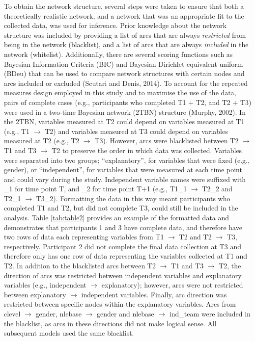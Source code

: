 \documentclass[
  english,
  man,floatsintext]{apa6}
\begin{document}
To obtain the network structure, several steps were taken to ensure that both a theoretically realistic network, and a network that was an appropriate fit to the collected data, was used for inference.
Prior knowledge about the network structure was included by providing a list of arcs that are always \emph{restricted} from being in the network (blacklist), and a list of arcs that are always \emph{included} in the network (whitelist).
Additionally, there are several scoring functions such as Bayesian Information Criteria (BIC) and Bayesian Dirichlet equivalent uniform (BDeu) that can be used to compare network structures with certain nodes and arcs included or excluded (Scutari and Denis, 2014).
To account for the repeated measures design employed in this study and to maximise the use of the data, pairs of complete cases (e.g., participants who completed T1 + T2, and T2 + T3) were used in a two-time Bayesian network (2TBN) structure (Murphy, 2002).
In the 2TBN, variables measured at T2 could depend on variables measured at T1 (e.g., T1 \(\rightarrow\) T2) and variables measured at T3 could depend on variables measured at T2 (e.g., T2 \(\rightarrow\) T3).
However, arcs were blacklisted between T2 \(\rightarrow\) T1 and T3 \(\rightarrow\) T2 to preserve the order in which data was collected.
Variables were separated into two groups; ``explanatory'', for variables that were fixed (e.g., gender), or ``independent'', for variables that were measured at each time point and could vary during the study.
Independent variable names were suffixed with \_1 for time point T, and \_2 for time point T+1 (e.g., T1\_1 \(\rightarrow\) T2\_2 and T2\_1 \(\rightarrow\) T3\_2).
Formatting the data in this way meant participants who completed T1 and T2, but did not complete T3, could still be included in the analysis.
Table \ref{tab:table2} provides an example of the formatted data and demonstrates that participants 1 and 3 have complete data, and therefore have two rows of data each representing variables from T1 \(\rightarrow\) T2 and T2 \(\rightarrow\) T3, respectively.
Participant 2 did not complete the final data collection at T3 and therefore only has one row of data representing the variables collected at T1 and T2.
In addition to the blacklisted arcs between T2 \(\rightarrow\) T1 and T3 \(\rightarrow\) T2, the direction of arcs was restricted between independent variables and explanatory variables (e.g., independent \(\rightarrow\) explanatory); however, arcs were not restricted between explanatory \(\rightarrow\) independent variables.
Finally, arc direction was restricted between specific nodes within the explanatory variables.
Arcs from clevel \(\rightarrow\) gender, nlebase \(\rightarrow\) gender and nlebase \(\rightarrow\) ind\_team were included in the blacklist, as arcs in these directions did not make logical sense.
All subsequent models used the same blacklist.
\end{document}
